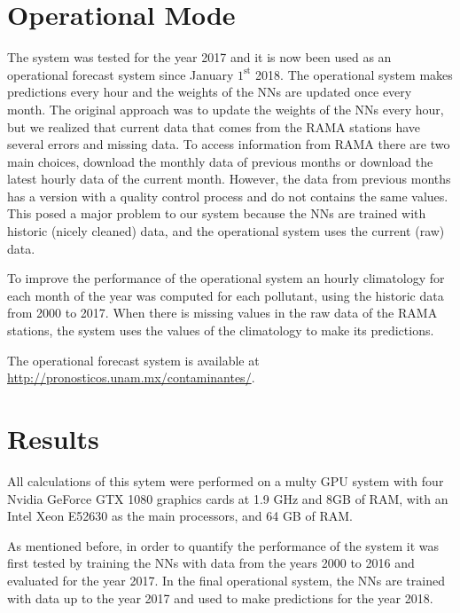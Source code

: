 \section{Operational Mode}
The system was tested for the year 2017 and it is now been used as an operational forecast
system since January $1^{\text{st}}$ 2018. The operational system makes predictions every hour and
the weights of the NNs are updated once every month. The original approach was to update the weights
of the NNs every hour, but we realized that current data that comes from the RAMA stations 
have several errors and missing data. To access information from RAMA there are two main choices, download the monthly data of
previous months or download the latest hourly data of the current month. However, the data
from previous months has a version with a quality control process and do not contains the 
same values. This posed 
a major problem to our system because the NNs are trained with historic (nicely cleaned) data, and
the operational system uses the current (raw) data.  

To improve the performance of the operational system an hourly climatology for each month 
of the year was computed for each pollutant, using the historic data from 2000 to 2017. When 
there is missing values in the raw data of the RAMA stations, the system uses the values of 
the climatology to make its predictions. 

The operational forecast system is available at \url{http://pronosticos.unam.mx/contaminantes/}.

\section{Results}
\label{sec:results}


All calculations of this sytem were performed on a multy GPU system with four Nvidia GeForce GTX 1080 
graphics cards at 1.9 GHz and 8GB of RAM, with an Intel Xeon E52630 as the main processors, and 64 GB of RAM. 


As mentioned before, in order to quantify the performance of the system it was first tested
 by training the NNs with data from the years 2000 to 2016 and evaluated for
the year 2017. In the final operational system, the NNs are trained with data up to the year 2017
and used to make predictions for the year 2018. 


